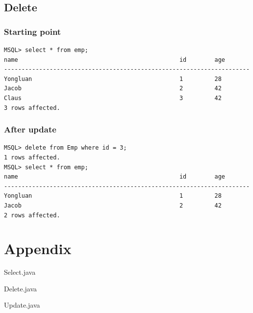 \documentclass[a4paper,10pt,titlepage]{report}
\begin{document}
\subsection{Delete}
\subsubsection{Starting point}
\begin{lstlisting}
MSQL> select * from emp;
name                                              id        age       
----------------------------------------------------------------------
Yongluan                                          1         28        
Jacob                                             2         42        
Claus                                             3         42        
3 rows affected.
\end{lstlisting}
\subsubsection{After update}

\begin{lstlisting}
MSQL> delete from Emp where id = 3;
1 rows affected.
MSQL> select * from emp;
name                                              id        age       
----------------------------------------------------------------------
Yongluan                                          1         28        
Jacob                                             2         42     
2 rows affected.  
\end{lstlisting}

\section{Appendix}
Select.java


Delete.java


Update.java

\end{document}
